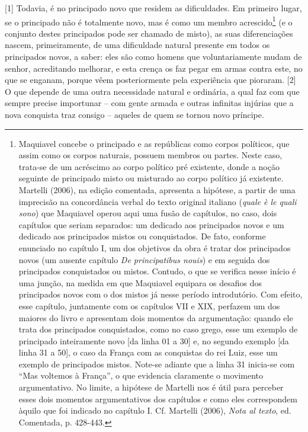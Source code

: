 {[}1{]} Todavia, é no principado novo que residem as dificuldades. Em
primeiro lugar, se o principado não é totalmente novo, mas é como um
membro acrescido\footnote{Maquiavel concebe o principado e as repúblicas
  como corpos políticos, que assim como os corpos naturais, possuem
  membros ou partes. Neste caso, trata-se de um acréscimo ao corpo
  político pré existente, donde a noção seguinte de principado misto ou
  misturado ao corpo político já existente. Martelli (2006), na edição
  comentada, apresenta a hipótese, a partir de uma imprecisão na
  concordância verbal do texto original italiano (\emph{quale è le quali
  sono}) que Maquiavel operou aqui uma fusão de capítulos, no caso, dois
  capítulos que seriam separados: um dedicado aos principados novos e um
  dedicado aos principados mistos ou conquistados. De fato, conforme
  enunciado no capítulo I, um dos objetivos da obra é tratar dos
  principados novos (um ausente capítulo \emph{De principatibus nouis})
  e em seguida dos principados conquistados ou mistos. Contudo, o que se
  verifica nesse início é uma junção, na medida em que Maquiavel
  equipara os desafios dos principados novos com o dos mistos já nesse
  período introdutório. Com efeito, esse capítulo, juntamente com os
  capítulos VII e XIX, perfazem um dos maiores do livro e apresentam
  dois momentos da argumentação: quando ele trata dos principados
  conquistados, como no caso grego, esse um exemplo de principado
  inteiramente novo {[}da linha 01 a 30{]} e, no segundo exemplo {[}da
  linha 31 a 50{]}, o caso da França com as conquistas do rei Luiz, esse
  um exemplo de principados mistos. Note-se adiante que a linha 31
  inicia-se com ``Mas voltemos à França'', o que evidencia claramente o
  movimento argumentativo. No limite, a hipótese de Martelli nos é útil
  para perceber esses dois momentos argumentativos dos capítulos e como
  eles correspondem àquilo que foi indicado no capítulo I. Cf. Martelli
  (2006), \emph{Nota al texto}, ed. Comentada, p. 428-443.} (e o
conjunto destes principados pode ser chamado de misto), as suas
diferenciações nascem, primeiramente, de uma dificuldade natural
presente em todos os principados novos, a saber: eles são como homens
que voluntariamente mudam de senhor, acreditando melhorar, e esta crença
os faz pegar em armas contra este, no que se enganam, porque vêem
posteriormente pela experiência que pioraram. {[}2{]} O que depende de
uma outra necessidade natural e ordinária, a qual faz com que sempre
precise importunar -- com gente armada e outras infinitas injúrias que a
nova conquista traz consigo -- aqueles de quem se tornou novo príncipe.
